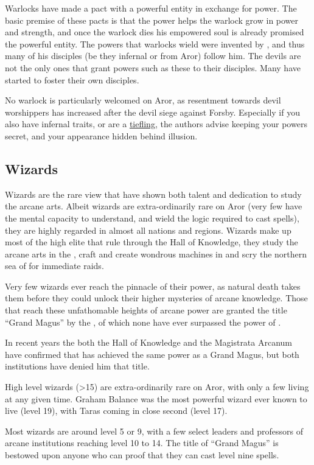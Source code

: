 Warlocks have made a pact with a powerful entity in exchange for power. The
basic premise of these pacts is that the power helps the warlock grow in
power and strength, and once the warlock dies his empowered soul is already
promised the powerful entity. The powers that warlocks wield were invented
by , and thus many of his disciples (be they infernal
or from Aror) follow him. The devils are not the only ones that grant powers
such as these to their disciples. Many  have started
to foster their own disciples.

No warlock is particularly welcomed on Aror, as resentment towards devil
worshippers has increased after the devil siege against Forsby. Especially if
you also have infernal traits, or are a \hyperref[sec:Tieflings]{tiefling},
the authors advise keeping your powers secret, and your appearance hidden
behind illusion.

\subsection{Wizards}
\label{sec:Wizards}

Wizards are the rare view that have shown both talent and dedication to study
the arcane arts. Albeit wizards are extra-ordinarily rare on Aror (very few
have the mental capacity to understand, and wield the logic required to cast
spells), they are highly regarded in almost all nations and regions. Wizards
make up most of the high elite that rule  through
the Hall of Knowledge, they study the arcane arts in the , craft and create wondrous machines in  and
scry the northern sea of  for immediate raids.

Very few wizards ever reach the pinnacle of their power, as natural death
takes them before they could unlock their higher mysteries of arcane
knowledge. Those that reach these unfathomable heights of arcane power are
granted the title ``Grand Magus'' by the ,
of which none have ever surpassed the power of .

In recent years the both the Hall of Knowledge and the Magistrata Arcanum
have confirmed that  has achieved the same power as a
Grand Magus, but both institutions have denied him that title.

\begin{note}
  High level wizards (>15) are extra-ordinarily rare on Aror, with only a few
  living at any given time. Graham Balance was the most powerful wizard ever
  known to live (level 19), with Taras coming in close second (level 17).

  Most wizards are around level 5 or 9, with a few select leaders and professors
  of arcane institutions reaching level 10 to 14. The title of ``Grand Magus''
  is bestowed upon anyone who can proof that they can cast level nine spells.
\end{note}
